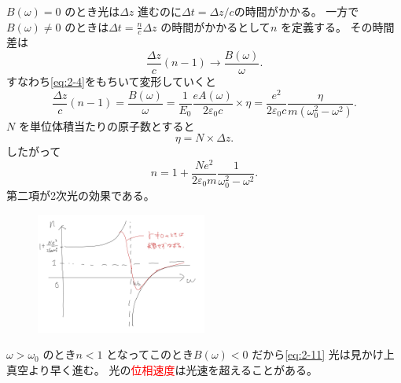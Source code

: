 \documentclass[dvipdfmx]{jsarticle}
\begin{document}
$B(\omega)=0$ のとき光は$\Delta z$ 進むのに$\Delta t=\Delta z /c$の時間がかかる。
一方で$B(\omega)\neq 0$ のときは$\Delta t= \frac{n}{c}\Delta z$ の時間がかかるとして$n$ を定義する。
その時間差は
\[
\frac{\Delta z}{c}(n-1)\to \frac{B(\omega)}{\omega}
.\] 
すなわち\eqref{eq:2-4}をもちいて変形していくと
\[
\frac{\Delta z}{c}(n-1)=\frac{B(\omega)}{\omega}=\frac{1}{E_0} \frac{eA(\omega)}{2\varepsilon_0 c}\times \eta=\frac{e^2}{2\varepsilon_0c}\frac{\eta}{m(\omega^2_0-\omega^2)}
.\] 
$N$ を単位体積当たりの原子数とすると
\[
\eta=N\times \Delta z
.\] 
したがって
\begin{equation}
\label{eq:2-12}
	n=1+\frac{Ne^2}{2\varepsilon_0m}\frac{1}{\omega_0^2-\omega^2}
.\end{equation}
第二項が2次光の効果である。
\begin{figure}[H]
	\centering
	\includegraphics[width=0.5\textwidth]{fig2/Fig-8.jpg}
	\label{fig:fig2-Fig-8-jpg}
\end{figure}
$\omega>\omega_0$ のとき$n<1$ となってこのとき$B(\omega)<0$ だから\eqref{eq:2-11}
光は見かけ上真空より早く進む。
光の\textcolor{red}{位相速度}は光速を超えることがある。
\end{document}
